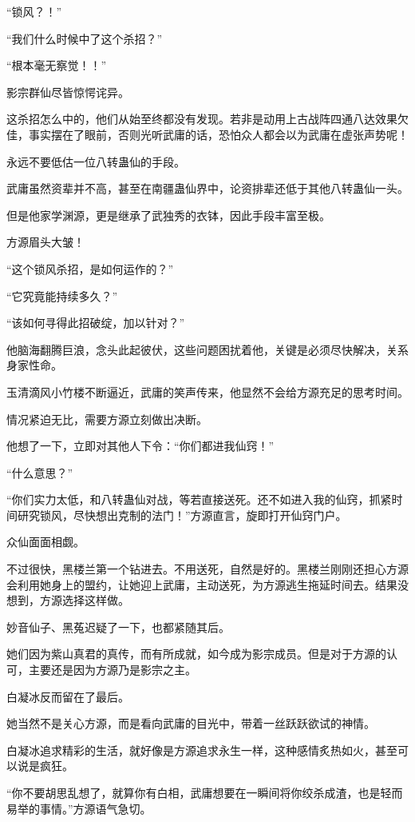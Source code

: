 
\begin{this_body}

“锁风？！”

“我们什么时候中了这个杀招？”

“根本毫无察觉！！”

影宗群仙尽皆惊愕诧异。

这杀招怎么中的，他们从始至终都没有发现。若非是动用上古战阵四通八达效果欠佳，事实摆在了眼前，否则光听武庸的话，恐怕众人都会以为武庸在虚张声势呢！

永远不要低估一位八转蛊仙的手段。

武庸虽然资辈并不高，甚至在南疆蛊仙界中，论资排辈还低于其他八转蛊仙一头。

但是他家学渊源，更是继承了武独秀的衣钵，因此手段丰富至极。

方源眉头大皱！

“这个锁风杀招，是如何运作的？”

“它究竟能持续多久？”

“该如何寻得此招破绽，加以针对？”

他脑海翻腾巨浪，念头此起彼伏，这些问题困扰着他，关键是必须尽快解决，关系身家性命。

玉清滴风小竹楼不断逼近，武庸的笑声传来，他显然不会给方源充足的思考时间。

情况紧迫无比，需要方源立刻做出决断。

他想了一下，立即对其他人下令：“你们都进我仙窍！”

“什么意思？”

“你们实力太低，和八转蛊仙对战，等若直接送死。还不如进入我的仙窍，抓紧时间研究锁风，尽快想出克制的法门！”方源直言，旋即打开仙窍门户。

众仙面面相觑。

不过很快，黑楼兰第一个钻进去。不用送死，自然是好的。黑楼兰刚刚还担心方源会利用她身上的盟约，让她迎上武庸，主动送死，为方源逃生拖延时间去。结果没想到，方源选择这样做。

妙音仙子、黑菟迟疑了一下，也都紧随其后。

她们因为紫山真君的真传，而有所成就，如今成为影宗成员。但是对于方源的认可，主要还是因为方源乃是影宗之主。

白凝冰反而留在了最后。

她当然不是关心方源，而是看向武庸的目光中，带着一丝跃跃欲试的神情。

白凝冰追求精彩的生活，就好像是方源追求永生一样，这种感情炙热如火，甚至可以说是疯狂。

“你不要胡思乱想了，就算你有白相，武庸想要在一瞬间将你绞杀成渣，也是轻而易举的事情。”方源语气急切。


\end{this_body}
